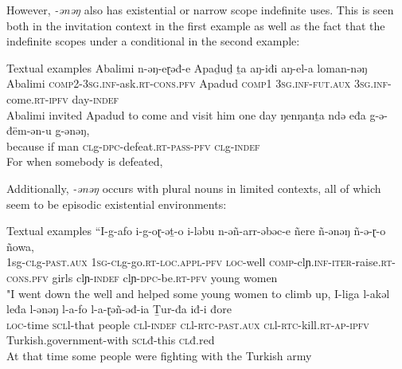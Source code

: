 However, \textit{-ənəŋ} also has existential or narrow scope indefinite uses. This is seen both in the invitation context in the first example as well as the fact that the indefinite scopes under a conditional in the second example:



\ea Textual examples
\ea \gll Abalimi n-ǝŋ-eɽǝđ-e Apaḏuḏ ṯa aŋ-iđi aŋ-el-a loman-nǝŋ\\
Abalimi \textsc{comp}2-3\textsc{sg}.\textsc{inf}-ask.\textsc{rt}-\textsc{cons}.\textsc{pfv} Apadud \textsc{comp}1 3\textsc{sg}.\textsc{inf}-\textsc{fut.aux} 3\textsc{sg}.\textsc{inf}-come.\textsc{rt}-\textsc{ipfv} day-\textsc{indef}\\
	\glt Abalimi invited Apadud to come and visit him one day
\ex \gll ŋenŋanṯa ndǝ eđa g-ǝ-đëm-ǝn-u g-ǝnǝŋ,\\
because if man \textsc{cl}g-\textsc{dpc}-defeat.\textsc{rt}-\textsc{pass}-\textsc{pfv} \textsc{cl}g-\textsc{indef}\\
\glt For when somebody is defeated,
\z 
\z 

Additionally, \textit{-ənəŋ} occurs with plural nouns in limited contexts, all of which seem to be episodic existential environments:

\ea Textual examples
\ea \gll “I-g-afo i-g-oɽ-ǝṯ-o i-lǝbu n-ǝñ-arr-ǝbǝc-e ñere ñ-ǝnǝŋ ñ-ǝ-ɽ-o ñowa,\\
1sg-\textsc{cl}g-\textsc{past.aux} 1\textsc{sg}-\textsc{cl}g-go.\textsc{rt}-\textsc{loc}.\textsc{appl}-\textsc{pfv} \textsc{loc}-well \textsc{comp}-clɲ.\textsc{inf}-\textsc{iter}-raise.\textsc{rt}-\textsc{cons}.\textsc{pfv} girls clɲ-\textsc{indef} clɲ-\textsc{dpc}-be.\textsc{rt}-\textsc{pfv} young women\\
\glt "I went down the well and helped some young women to climb up,
\ex \gll I-liga l-akǝl leđa l-ǝnǝŋ l-a-fo l-a-ɽǝñ-ǝđ-ia Ṯur-đa iđ-i đore\\
\textsc{loc}-time \textsc{scl}l-that people \textsc{cl}l-\textsc{indef} \textsc{cl}l-\textsc{rtc}-\textsc{past.aux} \textsc{cl}l-\textsc{rtc}-kill.\textsc{rt}-\textsc{ap}-\textsc{ipfv} Turkish.government-with \textsc{scl}đ-this \textsc{cl}đ.red\\
\glt At that time some people were fighting with the Turkish army
\z 
\z 

